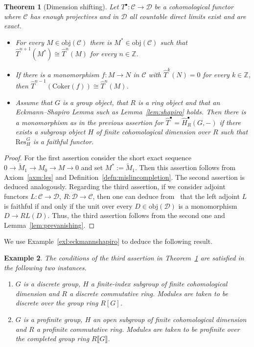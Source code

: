 \documentclass[12pt, a4paper]{article}
\numberwithin{equation}{section}
\newtheorem{thm}{Theorem}[section]
\newtheorem{exl}[thm]{Example}
\theoremstyle{empty}
\theoremstyle{nonumberplain}
\newtheorem{proof}{Proof}
\begin{document}
\begin{thm}[Dimension shifting]\label{thm:dimshifting}
Let $T^{\bullet}: \mathcal{C} \rightarrow \mathcal{D}$ be a cohomological functor where $\mathcal{C}$ has enough projectives and in $\mathcal{D}$ all countable direct limits exist and are exact.
\begin{itemize}
\item For every $M \in \mathrm{obj}(\mathcal{C})$ there is $M^{\ast} \in \mathrm{obj}(\mathcal{C})$ such that $\widehat{T}^{n+1}(M^{\ast}) \cong \widehat{T}^n(M)$ for every $n \in \mathbb{Z}$.
\item If there is a monomorphism $f: M \rightarrow N$ in $\mathcal{C}$ with $\widehat{T}^k(N) = 0$ for every $k \in \mathbb{Z}$, then $\widehat{T}^{n-1}(\mathrm{Coker}(f)) \cong \widehat{T}^n(M)$.
\item Assume that $G$ is a group object, that $R$ is a ring object and that an Eckmann--Shapiro Lemma such as Lemma~\ref{lem:shapiro} holds. Then there is a monomorphism as in the previous assertion for $\widehat{T}^{\bullet} = \widehat{H}_R^{\bullet}(G, -)$ if there exists a subgroup object $H$ of finite cohomological dimension over $R$ such that $\mathrm{Res}_H^G$ is a faithful functor.
\end{itemize}
\end{thm}

\begin{proof}
For the first assertion consider the short exact sequence $0 \rightarrow \widetilde{M}_1 \rightarrow M_0 \rightarrow M \rightarrow 0$ and set $M^{\ast} := \widetilde{M}_1$. Then this assertion follows from Axiom~\ref{axm:les} and Definition~\ref{defn:mislincompletion}. The second assertion is deduced analogously. Regarding the third assertion, if we consider adjoint functors $L: \mathcal{C} \rightarrow \mathcal{D}$, $R: \mathcal{D} \rightarrow \mathcal{C}$, then one can deduce from~\cite[Theorem~IV.3.1]{mac78} that the left adjoint $L$ is faithful if and only if the unit over every $D \in \mathrm{obj}(\mathcal{D})$ is a monomorphism $D \rightarrow RL(D)$. Thus, the third assertion follows from the second one and Lemma~\ref{lem:prevanishing}.
\end{proof}

We use Example~\ref{exl:eckmannshapiro} to deduce the following result.

\begin{exl}\label{exl:dimshifting}
The conditions of the third assertion in Theorem~\ref{thm:dimshifting} are satisfied in the following two instances.
\begin{enumerate}
\item $G$ is a discrete group, $H$ a finite-index subgroup of finite cohomological dimension and $R$ a discrete commutative ring. Modules are taken to be discrete over the group ring $R[G]$.
\item $G$ is a profinite group, $H$ an open subgroup of finite cohomological dimension and $R$ a profinite commutative ring. Modules are taken to be profinite over the completed group ring $R{\llbracket}G{\rrbracket}$.
\end{enumerate}
\end{exl}
\end{document}
